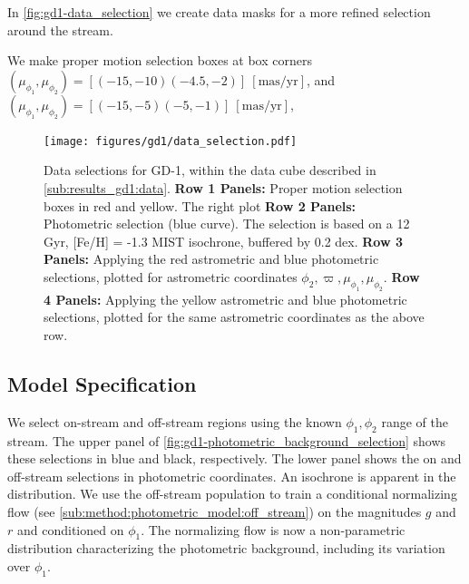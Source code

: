 \documentclass[twocolumn]{aastex631}
\newcommand{\stream}[1]{#1}
\newcommand{\unit}[1]{[\text{#1}]}
\begin{document}
        In \autoref{fig:gd1-data_selection} we create data masks for a more refined
        selection around the stream.

        We make proper motion selection boxes at box corners $(\mu_{\phi_1}, \mu_{\phi_2}) = [(-15,-10) (-4.5, -2)] \ \unit{mas/yr}$, and $(\mu_{\phi_1}, \mu_{\phi_2}) = [(-15,-5) (-5, -1)] \ \unit{mas/yr}$, 
        

        \begin{figure}[h]
            \centering
            \texttt{[image: figures/gd1/data\_selection.pdf]}
            \caption{%
                Data selections for \stream{GD-1}, within the data cube described
                in \autoref{sub:results_gd1:data}.
                \textbf{Row 1 Panels:}
                Proper motion selection boxes in red and yellow.
                The right plot
                \textbf{Row 2 Panels:}
                Photometric selection (blue curve). The selection is based on
                a 12 Gyr, [Fe/H] = -1.3 MIST isochrone, buffered by 0.2 dex.
                \textbf{Row 3 Panels:}
                Applying the red astrometric and blue photometric selections, plotted
                for astrometric coordinates $\phi_2, \varpi, \mu_{\phi_1}, \mu_{\phi_2}$.
                \textbf{Row 4 Panels:}
                Applying the yellow astrometric and blue photometric selections, plotted
                for the same astrometric coordinates as the above row.
            }
            \label{fig:gd1-data_selection}
        \end{figure}
        

    \subsection{Model Specification}\label{sub:results_gd1:model}

        We select on-stream and off-stream regions using the known $\phi_1,\phi_2$ range
        of the stream. The upper panel of \autoref{fig:gd1-photometric_background_selection}
        shows these selections in blue and black, respectively.
        The lower panel shows the on and off-stream selections in photometric
        coordinates. An isochrone is apparent in the distribution.
        We use the off-stream population to train a
        conditional normalizing flow (see \autoref{sub:method:photometric_model:off_stream})
        on the magnitudes $g$ and $r$ and conditioned on $\phi_1$.
        The normalizing flow is now a non-parametric distribution characterizing
        the photometric background, including its variation over $\phi_1$.
\end{document}
